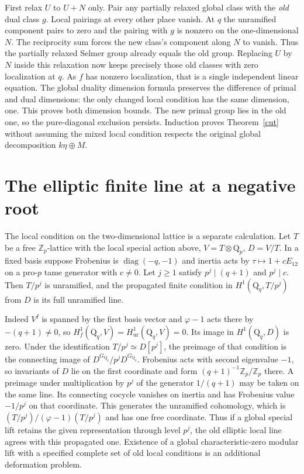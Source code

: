 \documentclass[11pt]{article}
\newcommand{\Q}{\mathrm{Q}}
\newcommand{\Zp}{\mathbb Z_p}
\newcommand{\unr}{\mathrm{ur}}
\begin{document}
First relax $U$ to $U+N$ only. Pair any partially relaxed global
class with the \emph{old} dual class $g$. Local pairings at every
other place vanish. At $q$ the unramified component pairs to zero
and the pairing with $g$ is nonzero on the one-dimensional $N$.
The reciprocity sum forces the new class's component along $N$
to vanish. Thus the partially relaxed Selmer group already equals
the old group. Replacing $U$ by $N$ inside this relaxation now
keeps precisely those old classes with zero localization at $q$.
As $f$ has nonzero localization, that is a single independent
linear equation. The global duality dimension formula preserves
the difference of primal and dual dimensions: the only changed
local condition has the same dimension, one. This proves both
dimension bounds. The new primal group lies in the old one, so the
pure-diagonal exclusion persists. Induction proves
Theorem~\ref{cut} without assuming the mixed local condition
respects the original global decomposition $k\eta\oplus M$.

\section{The elliptic finite line at a negative root}
The local condition on the two-dimensional lattice is a separate
calculation. Let $T$ be a free $\Zp$-lattice with the local special
action above, $V=T\otimes\Q_p$, $D=V/T$. In a fixed basis
suppose Frobenius is $\operatorname{diag}(-q,-1)$ and inertia
acts by $\tau\mapsto 1+cE_{12}$ on a pro-$p$ tame generator
with $c\ne0$. Let $j\ge1$ satisfy $p^j\mid(q+1)$ and $p^j\mid c$.
Then $T/p^j$ is unramified, and the propagated finite condition in
$H^1(\Q_q,T/p^j)$ from $D$ is its full unramified line.

Indeed $V^I$ is spanned by the first basis vector and
$\varphi-1$ acts there by $-(q+1)\ne0$, so
$H^1_f(\Q_q,V)=H^1_{\unr}(\Q_q,V)=0$. Its image in $H^1(\Q_q,D)$
is zero. Under the identification $T/p^j\simeq D[p^j]$, the
preimage of that condition is the connecting image of
$D^{G_{\Q_q}}/p^jD^{G_{\Q_q}}$.
Frobenius acts with second eigenvalue $-1$, so invariants of $D$
lie on the first coordinate and form
$(q+1)^{-1}\Zp/\Zp$ there. A preimage under multiplication by $p^j$
of the generator $1/(q+1)$ may be taken on the same line. Its
connecting cocycle vanishes on inertia and has Frobenius value
$-1/p^j$ on that coordinate. This generates the unramified
cohomology, which is $(T/p^j)/(\varphi-1)(T/p^j)$ and has one
free coordinate. Thus if a global special lift retains the given
representation through level $p^j$, the old elliptic local line
agrees with this propagated one. Existence of a global
characteristic-zero modular lift with a specified complete set of
old local conditions is an additional deformation problem.
\end{document}

